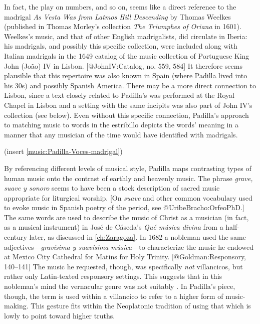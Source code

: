 In fact, the play on numbers,  and so on, seems like a direct
reference to the madrigal \emph{As Vesta Was from Latmos Hill Descending} by Thomas
Weelkes (published in Thomas Morley's collection \emph{The Triumphes of Oriana} in
1601).
Weelkes's music, and that of other English madrigalists, did circulate in
Iberia: his madrigals, and possibly this specific collection, were included
along with Italian madrigals in the 1649 catalog of the music collection of
Portuguese King John (João) IV in Lisbon.
[@JohnIV:Catalog, no. 559, 584]
It therefore seems plausible that this repertoire was also known in Spain
(where Padilla lived into his 30s) and possibly Spanish America.
There may be a more direct connection to Lisbon, since a text closely related to
Padilla's  was performed at the Royal Chapel in Lisbon and a setting with
the same incipits was also part of John IV's collection (see below).
Even without this specific connection, Padilla's approach to matching music to
words in the estribillo depicts the words' meaning in a manner that any musician
of the time would have identified with madrigals.

(insert \cref{music:Padilla-Voces-madrigal})
\label{music:Padilla-Voces-madrigal}

By referencing different levels of musical style, Padilla maps contrasting types
of human music onto the contrast of earthly and heavenly music.
The phrase \emph{grave, suave y sonoro} seems to have been a stock description of
sacred music appropriate for liturgical worship.
[On \emph{suave} and other common vocabulary used to evoke music in Spanish poetry of
the period, see @UribeBracho:OrfeoPhD.]
The same words are used to describe the music of Christ as a musician (in fact,
as a musical instrument) in José de Cáseda's \emph{Qué música divina} from a
half-century later, as discussed in \cref{ch:Zaragoza}.
In 1682 a nobleman used the same adjectives---\emph{gravísima y suavísima
música}---to characterize the music he endowed at Mexico City Cathedral for
Matins for Holy Trinity.
[@Goldman:Responsory, 140--141]
The music he requested, though, was specifically \emph{not} villancicos, but rather
only Latin-texted responsory settings.
This suggests that in this nobleman's mind the vernacular genre was not suitably
.
In Padilla's piece, though, the term is used within a villancico to refer to a
higher form of music-making. 
This gesture fits within the Neoplatonic tradition of using that which is lowly
to point toward higher truths.

